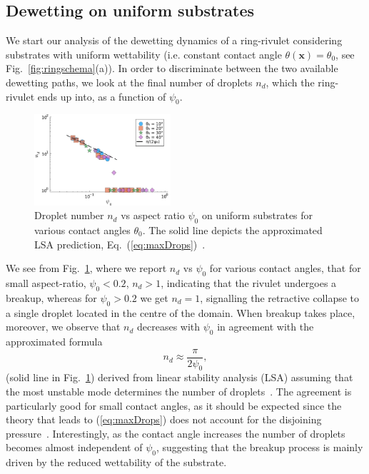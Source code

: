\documentclass[twoside,twocolumn,9pt]{article}
\begin{document}
\subsection{Dewetting on uniform substrates}\label{subsec:drop-counting}
We start our analysis of the dewetting dynamics of a ring-rivulet considering substrates with uniform wettability (i.e. constant contact angle $\theta(\mathbf{x}) = \theta_0$, see Fig.~\ref{fig:ringschema}(a)). 
In order to discriminate between the two available dewetting paths, we look at the final number of droplets $n_d$, which the ring-rivulet ends up into, as a function of $\psi_0$.
\begin{figure}
    \centering
    \includegraphics[width=0.45\textwidth]{Figure_2.pdf}   
    \caption{Droplet number $n_d$ vs aspect ratio $\psi_0$ on uniform substrates for various contact angles $\theta_0$. 
    The solid line depicts the approximated LSA prediction, Eq.~(\ref{eq:maxDrops})~\cite{gonzalezStabilityLiquidRing2013}.}
    \label{fig:max_drops}
\end{figure}
We see from Fig.~\ref{fig:max_drops}, where we report $n_d$ vs $\psi_0$ for various contact angles, that for small aspect-ratio, $\psi_0 <0.2$, $n_d>1$, indicating that the rivulet undergoes a breakup, whereas for $\psi_0>0.2$ we get $n_d=1$, signalling the retractive collapse to a single droplet located in the centre of the domain.
When breakup takes place, moreover, we observe that $n_d$ decreases with $\psi_0$ in agreement with the approximated formula 
\begin{equation}\label{eq:maxDrops}
    n_d \approx \frac{\pi}{2\psi_0},
\end{equation}
(solid line in Fig.~\ref{fig:max_drops}) derived from linear stability analysis (LSA) assuming that the most unstable mode determines the number of droplets~\cite{gonzalezStabilityLiquidRing2013}.
The agreement is particularly good for small contact angles, as it should be expected since the theory that leads to (\ref{eq:maxDrops}) does not account for the disjoining pressure~\cite{gonzalezStabilityLiquidRing2013}. 
Interestingly, as the contact angle increases the number of droplets becomes almost independent of $\psi_0$, suggesting that the breakup process is mainly driven by the reduced wettability of the substrate.
\end{document}

